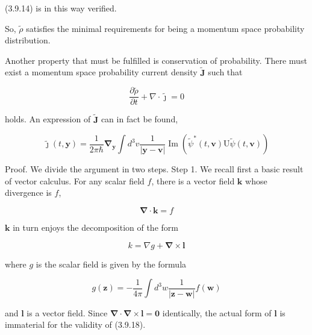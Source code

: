 \documentclass{article}
\begin{document}
(3.9.14) is in this way verified.

So, $\tilde{\rho}$ satisfies the minimal requirements for being a momentum space probability distribution.

Another property that must be fulfilled is conservation of probability. There must exist a momentum space probability current density $\tilde{\boldsymbol{J}}$ such that
 
\begin{equation*}
\frac{\partial \tilde{\rho}}{\partial t}+\nabla \cdot \tilde{\boldsymbol{\jmath}}=0 \tag{3.9.16}
\end{equation*}
 
holds. An expression of $\tilde{\boldsymbol{J}}$ can in fact be found,
 
\begin{equation*}
\tilde{\boldsymbol{\jmath}}(t, \boldsymbol{y})=\frac{1}{2 \pi \hbar} \boldsymbol{\nabla}_{\boldsymbol{y}} \int d^{3} v \frac{1}{|\boldsymbol{y}-\boldsymbol{v}|} \operatorname{Im}\left(\tilde{\psi}^{*}(t, \boldsymbol{v}) \mathrm{U} \tilde{\psi}(t, \boldsymbol{v})\right) \tag{3.9.17}
\end{equation*}
 

Proof. We divide the argument in two steps.
Step 1. We recall first a basic result of vector calculus. For any scalar field $f$, there is a vector field $\boldsymbol{k}$ whose divergence is $f$,
 
\begin{equation*}
\boldsymbol{\nabla} \cdot \boldsymbol{k}=f \tag{3.9.18}
\end{equation*}
 
$\boldsymbol{k}$ in turn enjoys the decomposition of the form
 
\begin{equation*}
k=\nabla g+\boldsymbol{\nabla} \times \boldsymbol{l} \tag{3.9.19}
\end{equation*}
 
where $g$ is the scalar field is given by the formula
 
\begin{equation*}
g(\boldsymbol{z})=-\frac{1}{4 \pi} \int d^{3} w \frac{1}{|\boldsymbol{z}-\boldsymbol{w}|} f(\boldsymbol{w}) \tag{3.9.20}
\end{equation*}
 
and $\boldsymbol{l}$ is a vector field. Since $\boldsymbol{\nabla} \cdot \boldsymbol{\nabla} \times \boldsymbol{l}=\mathbf{0}$ identically, the actual form of $\boldsymbol{l}$ is immaterial for the validity of (3.9.18).
\end{document}
